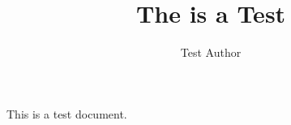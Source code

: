 \documentclass[a4paper, 12pt]{article}
\title{The is a Test}
\author{Test Author}
\begin{document}
\maketitle

This is a test document.
\end{document}
